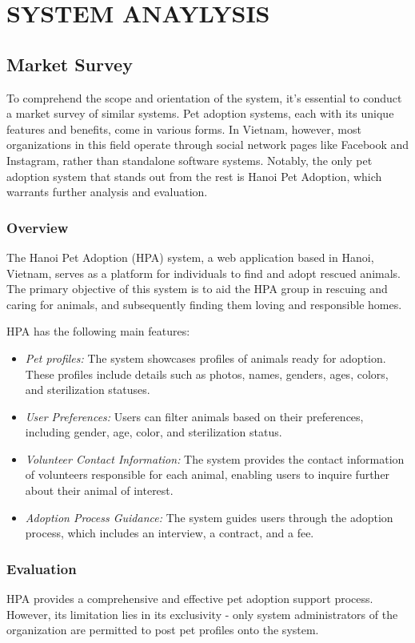 
\chapter{SYSTEM ANAYLYSIS}
\section{Market Survey}
To comprehend the scope and orientation of the system, it’s essential to conduct a market survey of similar systems. Pet adoption systems, each with its unique features and benefits, come in various forms. In Vietnam, however, most organizations in this field operate through social network pages like Facebook and Instagram, rather than standalone software systems. Notably, the only pet adoption system that stands out from the rest is Hanoi Pet Adoption, which warrants further analysis and evaluation.

\subsection{Overview}
The Hanoi Pet Adoption (HPA) system, a web application based in Hanoi, Vietnam, serves as a platform for individuals to find and adopt rescued animals. The primary objective of this system is to aid the HPA group in rescuing and caring for animals, and subsequently finding them loving and responsible homes.

HPA has the following main features:
\begin{itemize}
  \item \textit{Pet profiles:} The system showcases profiles of animals ready for adoption. These profiles include details such as photos, names, genders, ages, colors, and sterilization statuses.
  \item \textit{User Preferences:} Users can filter animals based on their preferences, including gender, age, color, and sterilization status.
  \item \textit{Volunteer Contact Information:} The system provides the contact information of volunteers responsible for each animal, enabling users to inquire further about their animal of interest.
  \item \textit{Adoption Process Guidance:} The system guides users through the adoption process, which includes an interview, a contract, and a fee.
\end{itemize}

\subsection{Evaluation}
HPA provides a comprehensive and effective pet adoption support process. However, its limitation lies in its exclusivity - only system administrators of the organization are permitted to post pet profiles onto the system.

